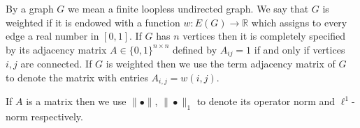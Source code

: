 \documentclass[12pt]{amsart}
\theoremstyle{remark}
\newcommand{\RR}{\mathbb{R}}
\begin{document}
By a graph $G$ we mean a finite loopless undirected graph. We say that $G$ is weighted if it is endowed with a function $w: E(G)\rightarrow \RR$ which assigns to every edge a real number in $[0,1]$. If $G$ has $n$ vertices then it is completely specified by its adjacency matrix $A\in \{0,1\}^{n\times n}$ defined by $A_{ij}=1$ if and only if vertices $i,j$ are connected. If $G$ is weighted then we use the term adjacency matrix of $G$ to denote the matrix with entries $A_{i,j}=w(i,j)$. 

If $A$ is a matrix then we use $\|\bullet\|$, $\|\bullet\|_1$ to denote its operator norm and $\ell^1$-norm respectively.







\end{document}
